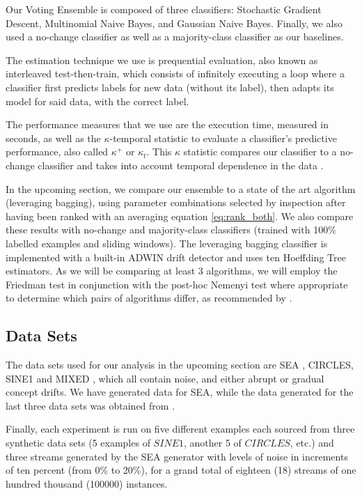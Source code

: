 \documentclass[runningheads]{llncs}
\begin{document}
Our Voting Ensemble is composed of three classifiers: Stochastic Gradient Descent, Multinomial Naive Bayes, and Gaussian Naive Bayes. Finally, we also used a no-change classifier as well as a majority-class classifier as our baselines.

The estimation technique we use is prequential evaluation, also known as interleaved test-then-train, which consists of infinitely executing a loop where a classifier first predicts labels for new data (without its label), then adapts its model for said data, with the correct label.

The performance measures that we use are the execution time, measured in seconds, as well as the $\kappa$-temporal statistic \cite{DBLP:conf/pkdd/2013-1} to evaluate a classifier's predictive performance, also called $\kappa^+$ or $\kappa_t$. This $\kappa$ statistic compares our classifier to a no-change classifier and takes into account temporal dependence in the data \cite{vzliobaite2015evaluation}.

In the upcoming section, we compare our ensemble to a state of the art algorithm (leveraging bagging), using parameter combinations selected by inspection after having been ranked with an averaging equation \ref{eq:rank_both}. We also compare these results with no-change and majority-class classifiers (trained with 100\% labelled examples and sliding windows). The leveraging bagging classifier is implemented with a built-in ADWIN drift detector and uses ten Hoeffding Tree estimators. As we will be comparing at least 3 algorithms, we will employ the Friedman test in conjunction with the post-hoc Nemenyi test where appropriate to determine which pairs of algorithms differ, as recommended by \cite{flach2012ml,japkowicz2011evaluating}.

\subsection{Data Sets}
The data sets used for our analysis in the upcoming section are SEA \cite{street2001streaming}, CIRCLES, SINE1 and MIXED \cite{10.1007/3-540-59286-5_74}, which all contain noise, and either abrupt or gradual concept drifts. We have generated data for SEA, while the data generated for the last three data sets was obtained from \cite{pesaranghader2016fast}.

Finally, each experiment is run on five different examples each sourced from three synthetic data sets (5 examples of $SINE1$, another 5 of $CIRCLES$, etc.) and three streams generated by the SEA generator with levels of noise in increments of ten percent (from 0\% to 20\%), for a grand total of eighteen (18) streams of one hundred thousand (100000) instances.
\end{document}
